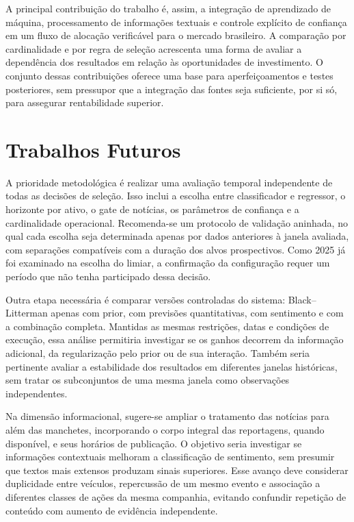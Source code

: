 A principal contribuição do trabalho é, assim, a integração de aprendizado de máquina, processamento de informações textuais e controle explícito de confiança em um fluxo de alocação verificável para o mercado brasileiro. A comparação por cardinalidade e por regra de seleção acrescenta uma forma de avaliar a dependência dos resultados em relação às oportunidades de investimento. O conjunto dessas contribuições oferece uma base para aperfeiçoamentos e testes posteriores, sem pressupor que a integração das fontes seja suficiente, por si só, para assegurar rentabilidade superior.

\section{Trabalhos Futuros}
\label{sec:conclusao_trabalhos_futuros}

A prioridade metodológica é realizar uma avaliação temporal independente de todas as decisões de seleção. Isso inclui a escolha entre classificador e regressor, o horizonte por ativo, o gate de notícias, os parâmetros de confiança e a cardinalidade operacional. Recomenda-se um protocolo de validação aninhada, no qual cada escolha seja determinada apenas por dados anteriores à janela avaliada, com separações compatíveis com a duração dos alvos prospectivos. Como 2025 já foi examinado na escolha do limiar, a confirmação da configuração requer um período que não tenha participado dessa decisão.

Outra etapa necessária é comparar versões controladas do sistema: Black--Litterman apenas com prior, com previsões quantitativas, com sentimento e com a combinação completa. Mantidas as mesmas restrições, datas e condições de execução, essa análise permitiria investigar se os ganhos decorrem da informação adicional, da regularização pelo prior ou de sua interação. Também seria pertinente avaliar a estabilidade dos resultados em diferentes janelas históricas, sem tratar os subconjuntos de uma mesma janela como observações independentes.

Na dimensão informacional, sugere-se ampliar o tratamento das notícias para além das manchetes, incorporando o corpo integral das reportagens, quando disponível, e seus horários de publicação. O objetivo seria investigar se informações contextuais melhoram a classificação de sentimento, sem presumir que textos mais extensos produzam sinais superiores. Esse avanço deve considerar duplicidade entre veículos, repercussão de um mesmo evento e associação a diferentes classes de ações da mesma companhia, evitando confundir repetição de conteúdo com aumento de evidência independente.

